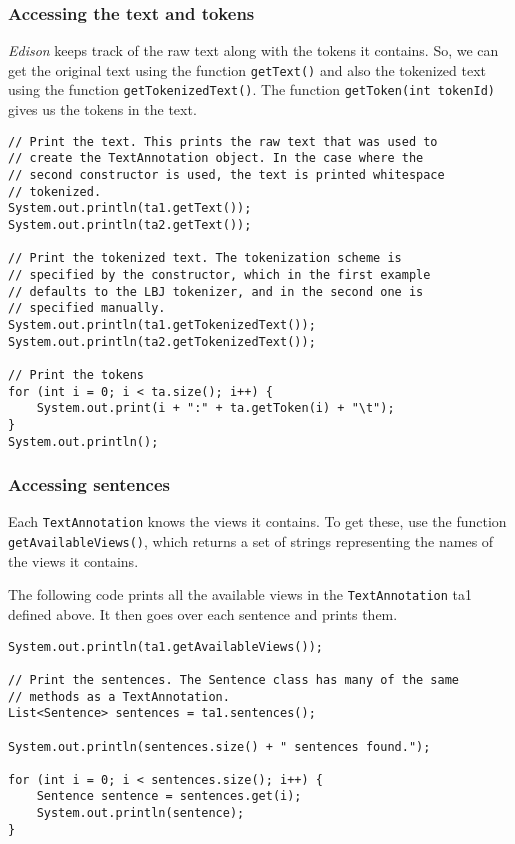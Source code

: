 \documentclass[11pt]{article}
\begin{document}
\subsubsection{Accessing the text and tokens}
\label{sec-6-1-2}

    \emph{Edison} keeps track of the raw text along with the tokens it
    contains. So, we can get the original text using the function
    \texttt{getText()} and also the tokenized text using the function
    \texttt{getTokenizedText()}. The function \texttt{getToken(int tokenId)} gives
    us the tokens in the text.


\lstset{frame=lines,basicstyle=\footnotesize,numbers=left,captionpos=b,showstringspaces=false,numberstyle=\tiny,language=java}
\begin{lstlisting}
// Print the text. This prints the raw text that was used to
// create the TextAnnotation object. In the case where the
// second constructor is used, the text is printed whitespace
// tokenized.
System.out.println(ta1.getText());
System.out.println(ta2.getText());

// Print the tokenized text. The tokenization scheme is
// specified by the constructor, which in the first example
// defaults to the LBJ tokenizer, and in the second one is
// specified manually.
System.out.println(ta1.getTokenizedText());
System.out.println(ta2.getTokenizedText());

// Print the tokens
for (int i = 0; i < ta.size(); i++) {
    System.out.print(i + ":" + ta.getToken(i) + "\t");
}
System.out.println();
\end{lstlisting}
\subsubsection{Accessing sentences}
\label{sec-6-1-3}

    Each \texttt{TextAnnotation} knows the views it contains. To get these,
    use the function \texttt{getAvailableViews()}, which returns a set of
    strings representing the names of the views it contains.


    The following code prints all the available views in the
    \texttt{TextAnnotation} ta1 defined above. It then goes over each
    sentence and prints them.
    

\lstset{frame=lines,basicstyle=\footnotesize,numbers=left,captionpos=b,showstringspaces=false,numberstyle=\tiny,language=java}
\begin{lstlisting}
System.out.println(ta1.getAvailableViews());

// Print the sentences. The Sentence class has many of the same
// methods as a TextAnnotation.
List<Sentence> sentences = ta1.sentences();

System.out.println(sentences.size() + " sentences found.");

for (int i = 0; i < sentences.size(); i++) {
    Sentence sentence = sentences.get(i);
    System.out.println(sentence);
}
\end{lstlisting}
    
\end{document}
